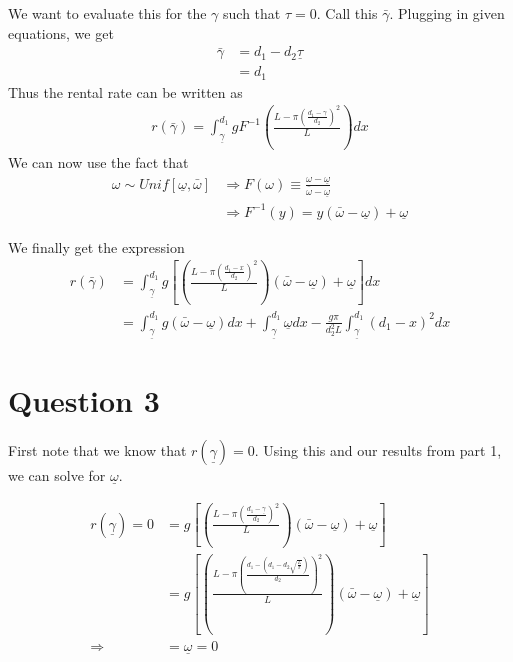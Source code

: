 \documentclass{article}
\begin{document}
We want to evaluate this for the $\gamma$ such that $\tau = 0$. Call this $\bar{\gamma}$. Plugging in given equations, we get 
\begin{align*}
    \bar{\gamma} &= d_1 - d_2\underline{\tau} \\
    &= d_1
\end{align*}
Thus the rental rate can be written as
\begin{align*}
    r(\bar{\gamma})=\int_{\underline{\gamma}}^{d_1} g F^{-1}\left(\frac{L-\pi\left(\frac{d_1 - \gamma}{d_2}\right)^2}{L}\right) d x
\end{align*}
We can now use the fact that 
\begin{align*}
    \omega \sim Unif[\underline{\omega}, \bar{\omega}] &\Rightarrow F(\omega)\equiv \frac{\omega-\underline{\omega}}{\bar{\omega}-\underline{\omega}} \\
    &\Rightarrow F^{-1}(y) = y(\bar{\omega}-\underline{\omega})+\underline{\omega}
\end{align*}

We finally get the expression
\begin{align*}
    r(\bar{\gamma}) &= \int_{\underline{\gamma}}^{d_1} g\left[\left(\frac{L-\pi\left(\frac{d_{1}-x}{d_{2}}\right)^{2}}{L}\right)(\bar{\omega}-\underline{\omega})+\underline{\omega}\right] d x \\
    &= \int_{\underline{\gamma}}^{d_1} g (\bar{\omega}-\underline{\omega}) dx + \int_{\underline{\gamma}}^{d_1} \underline{\omega} dx - \frac{g\pi}{d_2^2L}\int_{\underline{\gamma}}^{d_1} (d_1 - x)^2dx
\end{align*}

\section*{Question 3}
First note that we know that $r(\underline{\gamma}) = 0$. Using this and our results from part 1, we can solve for $\underline{\omega}$. 

\begin{align*}
    r(\underline{\gamma}) = 0 &= g\left[\left(\frac{L-\pi\left(\frac{d_{1}-\underline{\gamma}}{d_{2}}\right)^{2}}{L}\right)(\bar{\omega}-\underline{\omega})+\underline{\omega}\right] \\
    &= g\left[\left(\frac{L-\pi\left(\frac{d_{1}-\left(d_1 - d_2\sqrt{\frac{L}{\pi}}\right)}{d_{2}}\right)^{2}}{L}\right)(\bar{\omega}-\underline{\omega})+\underline{\omega}\right]  \\
    \Rightarrow &= \underline{\omega} = 0
\end{align*}
\end{document}

